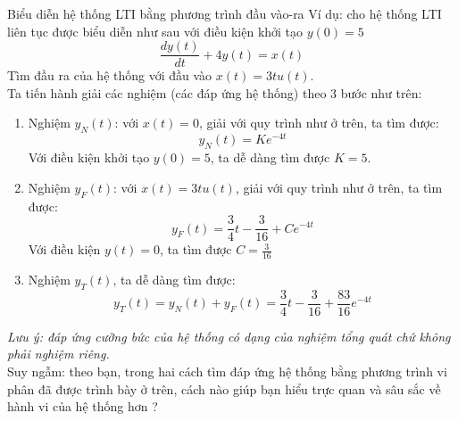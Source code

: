\documentclass[8pt]{beamer}
\begin{document}
\begin{frame}{Biểu diễn hệ thống LTI bằng phương trình đầu vào-ra}
Ví dụ: cho hệ thống LTI liên tục được biểu diễn như sau với điều kiện khởi tạo $y(0)=5$
$$\frac{dy(t)}{dt}+4y(t)=x(t)$$
Tìm đầu ra của hệ thống với đầu vào $x(t)=3tu(t)$.
\\ Ta tiến hành giải các nghiệm (các đáp ứng hệ thống) theo 3 bước như trên:
\begin{enumerate}
	\item Nghiệm $y_{N}(t)$: với \alert{$x(t)=0$}, giải với quy trình như ở trên, ta tìm được: $$y_{N}(t)=Ke^{-4t}$$
Với điều kiện khởi tạo $y(0)=5$, ta dễ dàng tìm được $K=5$.
	\item Nghiệm $y_{F}(t)$: với $x(t)=3tu(t)$, giải với quy trình như ở trên, ta tìm được:
		$$y_{F}(t)=\frac{3}{4}t-\frac{3}{16}+Ce^{-4t}$$
		Với điều kiện \alert{$y(t)=0$}, ta tìm được $C=\frac{3}{16}$
	\item Nghiệm $y_{T}(t)$, ta dễ dàng tìm được:
		$$y_{T}(t)=y_{N}(t)+y_{F}(t)=\frac{3}{4}t-\frac{3}{16}+\frac{83}{16}e^{-4t}$$
\end{enumerate}
\alert{\textit{Lưu ý: đáp ứng cưỡng bức của hệ thống có dạng của nghiệm tổng quát chứ không phải nghiệm riêng.}}
\\Suy ngẫm: theo bạn, trong hai cách tìm đáp ứng hệ thống bằng phương trình vi phân đã được trình bày ở trên, cách nào giúp bạn hiểu trực quan và sâu sắc về hành vi của hệ thống hơn ? 
\end{frame}
\end{document}
